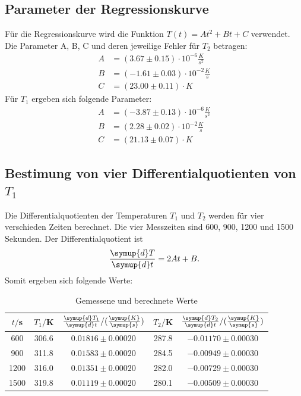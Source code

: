 \subsection{Parameter der Regressionskurve}
Für die Regressionskurve wird die Funktion $T(t) = At^2 + Bt + C$ verwendet. Die
Parameter A, B, C und deren jeweilige Fehler für $T_2$ betragen:
\begin{align}
  A &= (3.67 \pm 0.15) \cdot 10^{-6} \frac{K}{s^2} \\
  B &= (-1.61 \pm 0.03) \cdot 10^{-2} \frac{K}{s}  \\
  C &= (23.00 \pm 0.11) \cdot K
\end{align}
Für $T_1$ ergeben sich folgende Parameter:
\begin{align}
  A &= (-3.87 \pm 0.13) \cdot 10^{-6} \frac{K}{s^2} \\
  B &= (2.28 \pm 0.02)  \cdot 10^{-2} \frac{K}{s}  \\
  C &= (21.13 \pm 0.07 )\cdot K
\end{align}
\subsection{Bestimung von vier Differentialquotienten von $T_1$}
Die Differentialquotienten der Temperaturen $T_1$ und $T_2$ werden für vier verschieden
Zeiten berechnet. Die vier Messzeiten sind 600, 900, 1200 und 1500 Sekunden. Der
Differentialquotient ist
\begin{equation}
  \frac{\symup{d}T}{\symup{d}t} = 2At + B .
\end{equation}
Somit ergeben sich folgende Werte:
\begin{table}
  \centering
  \caption{Gemessene und berechnete Werte}
  \label{tab:Parameter}
  \begin{tabular}{c c c c c}
    \toprule
    $t/$s & $T_1/$K & $\frac{\symup{d}T_1}{\symup{d}t}/(\frac{\symup{K}}{\symup{s}})$ & $T_2/$K & $\frac{\symup{d}T_2}{\symup{d}t}/(\frac{\symup{K}}{\symup{s}})$  \\
    \midrule
      600 & 306.6 & $0.01816 \pm 0.00020$ & 287.8 & $-0.01170 \pm 0.00030$ \\
      900 & 311.8 & $0.01583 \pm 0.00020$ & 284.5 & $-0.00949 \pm 0.00030$ \\
      1200 & 316.0 & $0.01351 \pm 0.00020$ & 282.0 & $-0.00729 \pm 0.00030$ \\
      1500 & 319.8 & $0.01119 \pm 0.00020$ & 280.1 & $-0.00509 \pm 0.00030$ \\
   \bottomrule
 \end{tabular}
\end{table}

